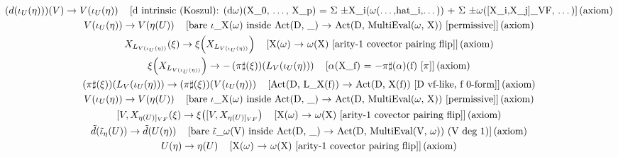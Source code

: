 \documentclass[11pt]{article}
\begin{document}
{\begin{gather*}
\left(d\!\left(\iota_U\!\left(\eta\right)\right)\right)\!\left(V\right) \to V\!\left(\iota_U\!\left(\eta\right)\right) \quad \text{[d intrinsic (Koszul): (d\ensuremath{\omega})(X\_0, \ensuremath{\dots}, X\_p) = \ensuremath{\Sigma} \ensuremath{\pm}X\_i(\ensuremath{\omega}(\ensuremath{\dots},hat\_i,\ensuremath{\dots})) + \ensuremath{\Sigma} \ensuremath{\pm}\ensuremath{\omega}([X\_i,X\_j]\_VF, \ensuremath{\dots})]\,(axiom)} \\
V\!\left(\iota_U\!\left(\eta\right)\right) \to V\!\left(\eta\!\left(U\right)\right) \quad \text{[bare \ensuremath{\iota}\_X(\ensuremath{\omega}) inside Act(D, \_) \ensuremath{\to} Act(D, MultiEval(\ensuremath{\omega}, X))  [permissive]]\,(axiom)} \\
X_{L_{V(\iota_U(\eta))}}\!\left(\xi\right) \to \xi\!\left(X_{L_{V(\iota_U(\eta))}}\right) \quad \text{[X(\ensuremath{\omega}) \ensuremath{\to} \ensuremath{\omega}(X)  [arity-1 covector pairing flip]]\,(axiom)} \\
\xi\!\left(X_{L_{V(\iota_U(\eta))}}\right) \to -\left(\pi\sharp\!\left(\xi\right)\right)\!\left(L_V\!\left(\iota_U\!\left(\eta\right)\right)\right) \quad \text{[\ensuremath{\alpha}(X\_f) = \ensuremath{-}\ensuremath{\pi}\ensuremath{\sharp}(\ensuremath{\alpha})(f) [\ensuremath{\pi}]]\,(axiom)} \\
\left(\pi\sharp\!\left(\xi\right)\right)\!\left(L_V\!\left(\iota_U\!\left(\eta\right)\right)\right) \to \left(\pi\sharp\!\left(\xi\right)\right)\!\left(V\!\left(\iota_U\!\left(\eta\right)\right)\right) \quad \text{[Act(D, L\_X(f)) \ensuremath{\to} Act(D, X(f))  [D vf-like, f 0-form]]\,(axiom)} \\
V\!\left(\iota_U\!\left(\eta\right)\right) \to V\!\left(\eta\!\left(U\right)\right) \quad \text{[bare \ensuremath{\iota}\_X(\ensuremath{\omega}) inside Act(D, \_) \ensuremath{\to} Act(D, MultiEval(\ensuremath{\omega}, X))  [permissive]]\,(axiom)} \\
[V,X_{\eta(U)]_{VF}}\!\left(\xi\right) \to \xi\!\left([V,X_{\eta(U)]_{VF}}\right) \quad \text{[X(\ensuremath{\omega}) \ensuremath{\to} \ensuremath{\omega}(X)  [arity-1 covector pairing flip]]\,(axiom)} \\
\tilde{d}\!\left(\tilde{\iota}_{\eta}\!\left(U\right)\right) \to \tilde{d}\!\left(U\!\left(\eta\right)\right) \quad \text{[bare \ensuremath{\tilde{\ensuremath{\iota}}}\_\ensuremath{\omega}(V) inside Act(D, \_) \ensuremath{\to} Act(D, MultiEval(V, \ensuremath{\omega}))  (V deg 1)]\,(axiom)} \\
U\!\left(\eta\right) \to \eta\!\left(U\right) \quad \text{[X(\ensuremath{\omega}) \ensuremath{\to} \ensuremath{\omega}(X)  [arity-1 covector pairing flip]]\,(axiom)} \\

\end{gather*}}
\end{document}
